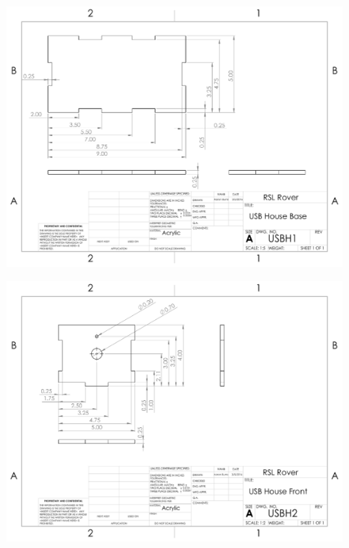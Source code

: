 \begin{figure}[H]
	\centerline{\includegraphics[angle=90,width=1.1\linewidth]{dwgs/USBH1.pdf}}
\end{figure}

\begin{figure}[H]
	\centerline{\includegraphics[angle=90,width=1.1\linewidth]{dwgs/USBH2.pdf}}
\end{figure}

